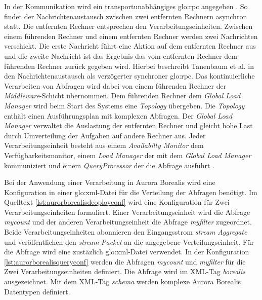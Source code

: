 In der Kommunikation wird ein transportunabhängiges \gls{glo:rpc} angegeben . So findet der Nachrichtenaustausch zwischen zwei entfernten Rechnern asynchron statt. Die entfernten Rechner entsprechen den Verarbeitungseinheiten. Zwischen einem führenden Rechner und einem entfernten Rechner werden zwei Nachrichten verschickt. Die erste Nachricht führt eine Aktion auf dem entfernten Rechner aus und die zweite Nachricht ist das Ergebnis das vom entfernten Rechner dem führenden Rechner zurück gegeben wird. Hierbei beschreibt Tanenbaum et al. in  den Nachrichtenaustausch als verzögerter synchroner \gls{glo:rpc}. Das kontinuierliche Verarbeiten von Abfragen wird dabei von einem führenden Rechner der \textit{Middleware}-Schicht übernommen. Dem führenden Rechner dem \textit{Global Load Manager}  wird beim Start des Systems eine \textit{Topology} übergeben. Die \textit{Topology} enthält einen Ausführungsplan mit komplexen Abfragen. Der \textit{Global Load Manager} verwaltet die Auslastung der entfernten Rechner und gleicht hohe Last durch Umverteilung der Aufgaben auf andere Rechner aus. Jeder Verarbeitungseinheit besteht aus einem \textit{Availabilty Monitor}  dem Verfügbarkeitsmonitor, einem \textit{Load Manager} der mit dem \textit{Global Load Manager} kommuniziert und einem \textit{QueryProcessor} der die Abfrage ausführt . 

Bei der Anwendung einer Verarbeitung in Aurora Borealis wird eine Konfiguration in einer \gls{glo:xml}-Datei für die Verteilung der Abfragen benötigt. Im Quelltext \ref{lst:aurorborealisdeoployconf} wird eine Konfiguration für Zwei Verarbeitungseinheiten formuliert. Einer Verarbeitungseinheit wird die Abfrage \textit{mycount} und der anderen Verarbeitungseinheit die Abfrage \textit{myfilter} zugeordnet. Beide Verarbeitungseinheiten abonnieren den Eingangsstrom \textit{stream} \textit{Aggregate} und veröffentlichen den \textit{stream} \textit{Packet} an die angegebene Verteilungseinheit. Für die Abfrage wird eine zustäzlich \gls{glo:xml}-Datei verwendet. In der Konfiguration \ref{lst:aurorborealisqueryconf} werden die Abfragen \textit{mycount} und \textit{myfilter} für die Zwei Verarbeitungseinheiten definiert. Die Abfrage wird im XML-Tag \textit{borealis} ausgezeichnet. Mit dem XML-Tag \textit{schema} werden komplexe Aurora Borealis Datentypen definiert. 

